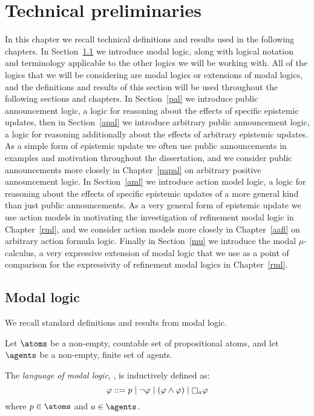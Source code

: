 \chapter{Technical preliminaries}\label{technical}

In this chapter we recall technical definitions and results used in the following chapters.
In Section~\ref{ml} we introduce modal logic, along with logical notation and terminology applicable to the other logics we will be working with.
All of the logics that we will be considering are modal logics or extensions of modal logics, and the definitions and results of this section will be used throughout the following sections and chapters. 
In Section~\ref{pal} we introduce public announcement logic, a logic for reasoning about the effects of specific epistemic updates, then in Section~\ref{apal} we introduce arbitrary public announcement logic, a logic for reasoning additionally about the effects of arbitrary epistemic updates.
As a simple form of epistemic update we often use public announcements in examples and motivation throughout the dissertation, and we consider public announcements more closely in Chapter~\ref{papal} on arbitrary positive announcement logic.
In Section~\ref{aml} we introduce action model logic, a logic for reasoning about the effects of specific epistemic updates of a more general kind than just public announcements.
As a very general form of epistemic update we use action models in motivating the investigation of refinement modal logic in Chapter~\ref{rml}, and we consider action models more closely in Chapter~\ref{aafl} on arbitrary action formula logic.
Finally in Section~\ref{mu} we introduce the modal $\mu$-calculus, a very expressive extension of modal logic that we use as a point of comparison for the expressivity of refinement modal logics in Chapter~\ref{rml}.

\section{Modal logic}\label{ml}

We recall standard definitions and results from modal logic.  

Let $\atoms$ be a non-empty, countable set of propositional atoms, and
let $\agents$ be a non-empty, finite set of agents.

\begin{definition}
The {\em language of modal logic}, \langMl{}, is inductively defined as:
$$
\phi ::= 
    \atomP \mid
    \lnot \phi \mid
    (\phi \land \phi) \mid
    \necessaryA \phi
$$
where $\atomP \in \atoms$ and $\agentA \in \agents$.
\end{definition}

